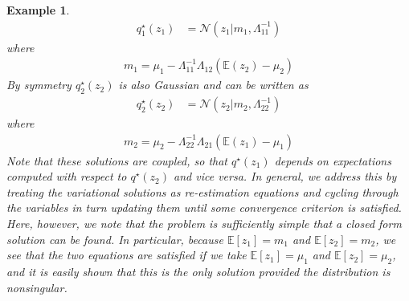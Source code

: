 \documentclass[10pt ]{article}
\newtheorem{example}{Example}
\begin{document}
\begin{example}
{\begin{align}
q_1^{\star}(z_1) &= \mathcal{N} (z_1 | m_1, \Lambda_{11}^{-1})
\label{eq_z1_derivation}
\end{align}
where
\begin{align}
m_1 = \mu_1 - \Lambda_{11}^{-1} \Lambda_{12} \left( \mathbb{E}(z_2) - \mu_2\right)
\label{eq_m1_derivation}
\end{align}
By symmetry $q_2^{\star}(z_2) $ is also Gaussian and can be written as
\begin{align}
q_2^{\star}(z_2) &= \mathcal{N} (z_2 | m_2, \Lambda_{22}^{-1})
\label{eq_z2_derivation}
\end{align}
where
\begin{align}
m_2 = \mu_2 - \Lambda_{22}^{-1} \Lambda_{21} \left( \mathbb{E}(z_1) - \mu_1\right)
\label{eq_m2_derivation}
\end{align}
Note that these solutions are coupled, so that $q^{\star}(z_1)$ depends on expectations computed with respect to $q^{\star}(z_2)$  and vice versa. In general, we address this by treating the variational solutions as re-estimation equations and cycling through the variables in turn updating them until some convergence criterion is satisfied. Here, however, we note that the problem is sufficiently simple that a closed form solution can be found. In particular, because $\mathbb{E}[z_1] = m_1$ and $\mathbb{E}[z_2] = m_2$, we see that the two equations are satisfied if we take $\mathbb{E}[z_1] = \mu_1$ and $\mathbb{E}[z_2] = \mu_2$, and it is easily shown that this is the only solution provided the distribution is nonsingular. 
}
\label{example_normal}
\end{example}
\end{document}
